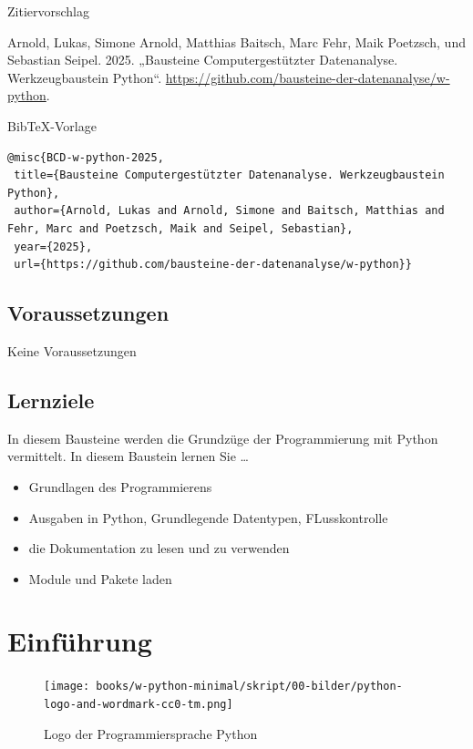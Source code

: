 \documentclass[
  letterpaper,
  DIV=11,
  numbers=noendperiod]{scrreprt}
\begin{document}
Zitiervorschlag

Arnold, Lukas, Simone Arnold, Matthias Baitsch, Marc Fehr, Maik
Poetzsch, und Sebastian Seipel. 2025. „Bausteine Computergestützter
Datenanalyse. Werkzeugbaustein Python``.
\url{https://github.com/bausteine-der-datenanalyse/w-python}.

BibTeX-Vorlage

\begin{verbatim}
@misc{BCD-w-python-2025,
 title={Bausteine Computergestützter Datenanalyse. Werkzeugbaustein Python},
 author={Arnold, Lukas and Arnold, Simone and Baitsch, Matthias and Fehr, Marc and Poetzsch, Maik and Seipel, Sebastian},
 year={2025},
 url={https://github.com/bausteine-der-datenanalyse/w-python}} 
\end{verbatim}

\section*{Voraussetzungen}\label{voraussetzungen}


Keine Voraussetzungen

\section*{Lernziele}\label{lernziele}


In diesem Bausteine werden die Grundzüge der Programmierung mit Python
vermittelt. In diesem Baustein lernen Sie \ldots{}

\begin{itemize}
\item
  Grundlagen des Programmierens
\item
  Ausgaben in Python, Grundlegende Datentypen, FLusskontrolle
\item
  die Dokumentation zu lesen und zu verwenden
\item
  Module und Pakete laden
\end{itemize}

\chapter{Einführung}\label{einfuxfchrung}

\begin{figure}[H]

{\centering \texttt{[image: books/w-python-minimal/skript/00-bilder/python-logo-and-wordmark-cc0-tm.png]}

}

\caption{Logo der Programmiersprache Python}

\end{figure}%
\end{document}
